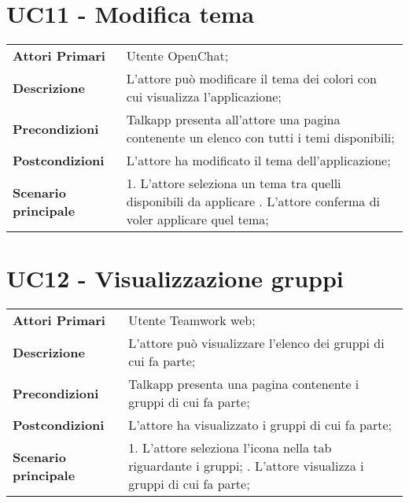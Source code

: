\section{UC11 - Modifica tema}
\begin{center}
	\bgroup
	\def\arraystretch{1.8}     
	\begin{longtable}{  p{4cm} | p{9.5cm} } 
		\textbf{Attori Primari} & Utente OpenChat; \\ 
		\textbf{Descrizione} &  L'attore può modificare il tema dei colori con cui visualizza l'applicazione; \\ 
		\textbf{Precondizioni}  & Talkapp presenta all'attore una pagina contenente un elenco con tutti i temi disponibili; \\
		\textbf{Postcondizioni} & L'attore ha modificato il tema dell'applicazione; \\ 
		\textbf{Scenario principale} & 
		1. L'attore seleziona un tema tra quelli disponibili da applicare \newline
		2. L'attore conferma di voler applicare quel tema;
	\end{longtable}
	\egroup
\end{center}

\section{UC12 - Visualizzazione gruppi}
\begin{center}
	\bgroup
	\def\arraystretch{1.8}     
	\begin{longtable}{  p{4cm} | p{9.5cm} } 
		\textbf{Attori Primari} & Utente Teamwork web; \\ 
		\textbf{Descrizione} &  L'attore può visualizzare l'elenco dei gruppi di cui fa parte; \\ 
		\textbf{Precondizioni}  & Talkapp presenta una pagina contenente i gruppi di cui fa parte; \\
		\textbf{Postcondizioni} & L'attore ha visualizzato i gruppi di cui fa parte; \\ 
		\textbf{Scenario principale} & 
		1. L'attore seleziona l'icona nella tab riguardante i gruppi; \newline
		2. L'attore visualizza i gruppi di cui fa parte;
	\end{longtable}
	\egroup
\end{center}


